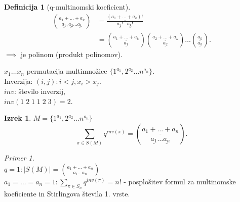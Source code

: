 \documentclass[a4paper, 12pt]{book}
\theoremstyle{definition}
\newtheorem{defn}[counter]{Definicija}
\newtheorem{theorem}[counter]{Izrek}
\theoremstyle{remark}
\newtheorem*{ex}{Primer}
\begin{document}
\begin{defn}[q-multinomski koeficient]
  \begin{align*}
    \binom{\underline{a_1 + \dots + a_k}}{\underline{a_1}, \underline{a_2} \dots \underline{a_k}}
    &= \frac{\underline{(a_1 + \dots + a_k)!}}{\underline{a_1!} \dots \underline{a_k!}} \\
    &= \binom{\underline{a_1 + \dots + a_k}}{\underline{a_1}}
      \binom{\underline{a_2 + \dots + a_k}}{\underline{a_2}} \dots \binom{\underline{a_k}}{\underline{a_k}}.
  \end{align*}
  $\implies$ je polinom (produkt polinomov).
\end{defn}
$x_1 \dots x_n$ permutacija multimnožice $\{1^{a_1}, 2^{a_2} \dots n^{a_n}\}$. \\
Inverzija: $(i,j): i < j, x_i > x_j$. \\
$inv$: število inverzij, \\
$inv(1 \; 2 \; 1 \; 1 \; 2 \; 3) = 2$.
\begin{theorem}
  $M = \{1^{a_1}, 2^{a_2} \dots n^{a_n}\}$
  \begin{equation*}
    \sum_{\pi \in S(M)} q^{inv(\pi)} = \binom{\underline{a_1 + \dots + a_n}}{\underline{a_1} \dots \underline{a_n}}.
  \end{equation*}
\end{theorem}
\begin{ex} \text{} \\
  $q = 1: |S(M)| = \binom{a_1 + \dots + a_n}{a_1 \dots a_n}$ \\
  $a_1 = \dots = a_n = 1: \sum_{\pi \in S_n} q^{inv(\pi)} = n!$ - posplošitev formul za multinomske koeficiente
  in Stirlingova števila 1. vrste.
\end{ex}
\end{document}
